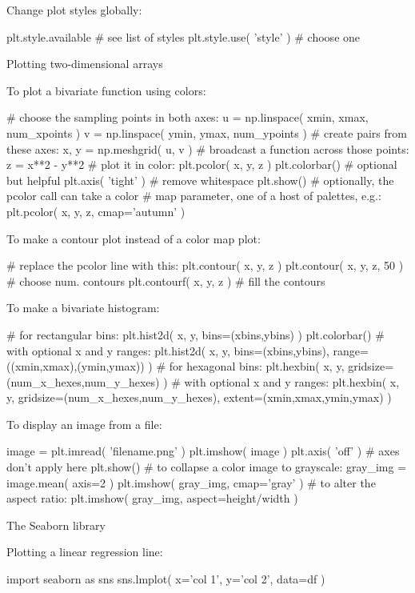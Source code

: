\documentclass[a4paper,landscape,columns=3]{cheatsheet}
\def\sect#1{\begin{tcolorbox}[colback=blue!5!white,colframe=blue!75!black,size=title,leftrule=2mm]
    \large #1
\end{tcolorbox}}
\begin{document}
Change plot styles globally:
\begin{python}
plt.style.available       # see list of styles
plt.style.use( 'style' )  # choose one
\end{python}

\sect{Plotting two-dimensional arrays}

To plot a bivariate function using colors:
\begin{python}
# choose the sampling points in both axes:
u = np.linspace( xmin, xmax, num_xpoints )
v = np.linspace( ymin, ymax, num_ypoints )
# create pairs from these axes:
x, y = np.meshgrid( u, v )
# broadcast a function across those points:
z = x**2 - y**2
# plot it in color:
plt.pcolor( x, y, z )
plt.colorbar()       # optional but helpful
plt.axis( 'tight' )  # remove whitespace
plt.show()
# optionally, the pcolor call can take a color
# map parameter, one of a host of palettes, e.g.:
plt.pcolor( x, y, z, cmap='autumn' )
\end{python}

To make a contour plot instead of a color map plot:
\begin{python}
# replace the pcolor line with this:
plt.contour( x, y, z )
plt.contour( x, y, z, 50 )  # choose num. contours
plt.contourf( x, y, z )     # fill the contours
\end{python}

To make a bivariate histogram:
\begin{python}
# for rectangular bins:
plt.hist2d( x, y, bins=(xbins,ybins) )
plt.colorbar()
# with optional x and y ranges:
plt.hist2d( x, y, bins=(xbins,ybins),
            range=((xmin,xmax),(ymin,ymax)) )
# for hexagonal bins:
plt.hexbin( x, y,
            gridsize=(num_x_hexes,num_y_hexes) )
# with optional x and y ranges:
plt.hexbin( x, y,
            gridsize=(num_x_hexes,num_y_hexes),
            extent=(xmin,xmax,ymin,ymax) )
\end{python}

To display an image from a file:
\begin{python}
image = plt.imread( 'filename.png' )
plt.imshow( image )
plt.axis( 'off' )           # axes don't apply here
plt.show()
# to collapse a color image to grayscale:
gray_img = image.mean( axis=2 )
plt.imshow( gray_img, cmap='gray' )
# to alter the aspect ratio:
plt.imshow( gray_img, aspect=height/width )
\end{python}

\sect{The Seaborn library}

Plotting a linear regression line:
\begin{python}
import seaborn as sns
sns.lmplot( x='col 1', y='col 2', data=df )
\end{python}
\end{document}
